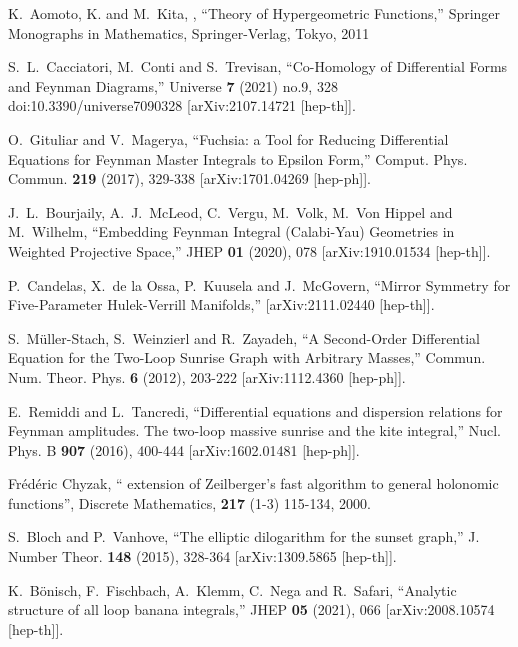 \documentclass[a4paper,12pt]{article}
\numberwithin{equation}{section}
\numberwithin{figure}{section}
\begin{document}
\begin{thebibliography}{99}
     K.~Aomoto, K. and M.~Kita, , ``Theory of Hypergeometric Functions,'' Springer Monographs in Mathematics, Springer-Verlag, Tokyo, 2011
    
S.~L.~Cacciatori, M.~Conti and S.~Trevisan,
``Co-Homology of Differential Forms and Feynman Diagrams,''
Universe \textbf{7} (2021) no.9, 328
doi:10.3390/universe7090328
[arXiv:2107.14721 [hep-th]].
  
O.~Gituliar and V.~Magerya,
``Fuchsia: a Tool for Reducing Differential Equations for Feynman Master Integrals to Epsilon Form,''
Comput. Phys. Commun. \textbf{219} (2017), 329-338
[arXiv:1701.04269 [hep-ph]].

J.~L.~Bourjaily, A.~J.~McLeod, C.~Vergu, M.~Volk, M.~Von Hippel and M.~Wilhelm,
``Embedding Feynman Integral (Calabi-Yau) Geometries in Weighted Projective Space,''
JHEP \textbf{01} (2020), 078
[arXiv:1910.01534 [hep-th]].

P.~Candelas, X.~de la Ossa, P.~Kuusela and J.~McGovern,
``Mirror Symmetry for Five-Parameter Hulek-Verrill Manifolds,''
[arXiv:2111.02440 [hep-th]].

S.~M\"uller-Stach, S.~Weinzierl and R.~Zayadeh,
``A Second-Order Differential Equation for the Two-Loop Sunrise Graph with Arbitrary Masses,''
Commun. Num. Theor. Phys. \textbf{6} (2012), 203-222
[arXiv:1112.4360 [hep-ph]].

E.~Remiddi and L.~Tancredi,
``Differential equations and dispersion relations for Feynman amplitudes. The two-loop massive sunrise and the kite integral,''
Nucl. Phys. B \textbf{907} (2016), 400-444
[arXiv:1602.01481 [hep-ph]].

  Fr\'ed\'eric Chyzak, `` extension of
    Zeilberger's fast algorithm to general holonomic functions'',
Discrete Mathematics, {\bf 217} (1-3) 115-134, 2000.

S.~Bloch and P.~Vanhove,
``The elliptic dilogarithm for the sunset graph,''
J. Number Theor. \textbf{148} (2015), 328-364
[arXiv:1309.5865 [hep-th]].

K.~B\"onisch, F.~Fischbach, A.~Klemm, C.~Nega and R.~Safari,
``Analytic structure of all loop banana integrals,''
JHEP \textbf{05} (2021), 066
[arXiv:2008.10574 [hep-th]].


\end{thebibliography}
\end{document}

